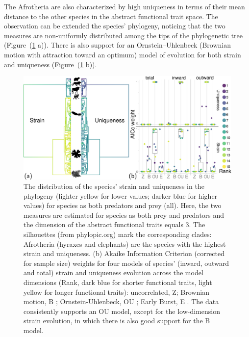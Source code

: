\documentclass[]{rsos}%
\begin{document}
The Afrotheria are also characterized by high uniqueness in terms of their
mean distance to the other species in the abstract functional trait space. The observation can
be extended the species' phylogeny, noticing that the two measures are non-uniformly
distributed among the tips of the phylogenetic tree (Figure~(\ref{fig:strain_2} a)). There is also support
for an Ornstein--Uhlenbeck (Brownian motion with attraction toward
an optimum) model of evolution for both strain and uniqueness (Figure~(\ref{fig:strain_2} b)).

\begin{figure}[hbt]
 \centering
 \includegraphics[width=\textwidth]{./images/chap_2/Figure_2.pdf}
 \caption{The distribution of the species' strain and uniqueness in the phylogeny
(lighter yellow for lower values; darker blue for higher values) for species as both
predators and prey (all). Here, the two measures are estimated for species as both
prey and predators and the dimension of the abstract functional traits equals 3.
The silhouettes (from phylopic.org) mark the corresponding clades:
Afrotheria (hyraxes and elephants) are the species with the highest strain and uniqueness.
(b) Akaike Information Criterion (corrected for sample size) weights for four models of species'
(inward, outward and total) strain and uniqueness evolution across the model dimensions (Rank, dark
blue for shorter functional traits, light yellow for longer functional traits):
uncorrelated, Z; Brownian motion, B \citep{felsenstein1985phylogenies};
Ornstein-Uhlenbeck, OU \citep{hansen1997stabilizing}; Early Burst, E
\citep{harmon2010early}. The data consistently supports an OU model, except
for the low-dimension strain evolution, in which there is also good support for the B model.}\label{fig:strain_2}
\end{figure}
\end{document}
